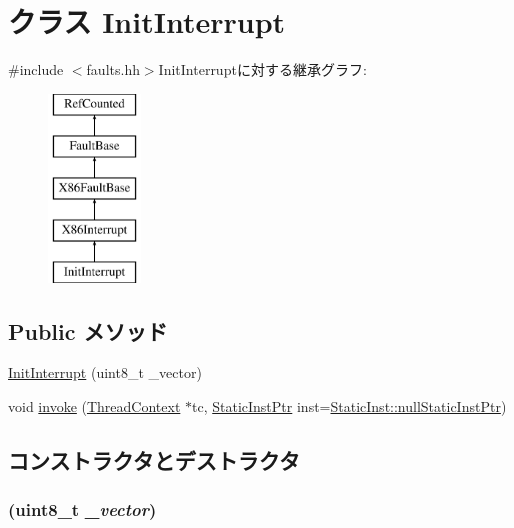 \hypertarget{classX86ISA_1_1InitInterrupt}{
\section{クラス InitInterrupt}
\label{classX86ISA_1_1InitInterrupt}
}


{\ttfamily \#include $<$faults.hh$>$}InitInterruptに対する継承グラフ:\begin{figure}[H]
\begin{center}
\leavevmode
\includegraphics[height=5cm]{classX86ISA_1_1InitInterrupt}
\end{center}
\end{figure}
\subsection*{Public メソッド}
\begin{DoxyCompactItemize}
\item 
\hyperlink{classX86ISA_1_1InitInterrupt_ae97d554dd37e49f62d2483933d5fd437}{InitInterrupt} (uint8\_\-t \_\-vector)
\item 
void \hyperlink{classX86ISA_1_1InitInterrupt_a2bd783b42262278d41157d428e1f8d6f}{invoke} (\hyperlink{classThreadContext}{ThreadContext} $\ast$tc, \hyperlink{classRefCountingPtr}{StaticInstPtr} inst=\hyperlink{classStaticInst_aa793d9793af735f09096369fb17567b6}{StaticInst::nullStaticInstPtr})
\end{DoxyCompactItemize}


\subsection{コンストラクタとデストラクタ}
\hypertarget{classX86ISA_1_1InitInterrupt_ae97d554dd37e49f62d2483933d5fd437}{
\subsubsection[{InitInterrupt}]{ (uint8\_\-t {\em \_\-vector})}}
\label{classX86ISA_1_1InitInterrupt_ae97d554dd37e49f62d2483933d5fd437}



